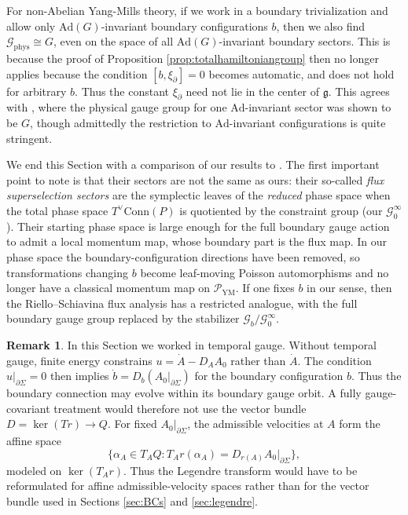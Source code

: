 \documentclass{article}
\theoremstyle{definition}
\newtheorem{remark}[definition]{Remark}
\begin{document}
For non-Abelian Yang-Mills theory, if we work in a boundary trivialization and allow only $\text{Ad}(G)$-invariant boundary configurations $b$, then we also find $\mathcal{G}_\text{phys}\cong G$, even on the space of all $\text{Ad}(G)$-invariant boundary sectors. This is because the proof of Proposition \ref{prop:totalhamiltoniangroup} then no longer applies because the condition $[b,\xi_\partial]=0$ becomes automatic, and does not hold for arbitrary $b$. Thus the constant $\xi_\partial$ need not lie in the center of $\mathfrak g$. This agrees with \cite{Borsboom:2025agn}, where the physical gauge group for one $\text{Ad}$-invariant sector was shown to be $G$, though admittedly the restriction to $\text{Ad}$-invariant configurations is quite stringent. 

We end this Section with a comparison of our results to \cite{rielloHamiltonianGaugeTheory2024}. The first important point to note is that their sectors are not the same as ours: their so-called \textit{flux superselection sectors} are the symplectic leaves of the \textit{reduced} phase space when the total phase space $T^\vee\text{Conn}(P)$ is quotiented by the constraint group (our $\mathcal{G}^\infty_0$). Their starting phase space is large enough for the full boundary gauge action to admit a local momentum map, whose boundary part is the flux map. In our phase space the boundary-configuration directions have been removed, so transformations changing \(b\) become leaf-moving Poisson
automorphisms and no longer have a classical momentum map on \(\mathcal{P}_{\mathrm{YM}}\). If one fixes \(b\) in our sense, then the Riello--Schiavina flux analysis has a restricted analogue, with the full boundary gauge group replaced by
the stabilizer \(\mathcal G_b/\mathcal G^\infty_0\).

\begin{remark}
In this Section we worked in temporal gauge. Without temporal gauge, finite energy constrains $u=\dot A-D_AA_0$
rather than \(\dot A\). The condition \(u|_{\partial\Sigma}=0\)
then implies $\dot b=D_b(A_0|_{\partial\Sigma})$
for the boundary configuration $b$. Thus the boundary connection may evolve within its boundary gauge
orbit. A fully gauge-covariant treatment would therefore not use the vector bundle
\(D=\ker(Tr)\to Q\). For fixed \(A_0|_{\partial\Sigma}\), the admissible
velocities at \(A\) form the affine space
\[
\{\alpha_A\in T_AQ:T_A r(\alpha_A)=D_{r(A)} A_0|_{\partial\Sigma}\},
\]
modeled on \(\ker(T_A r)\). Thus the Legendre transform would have to be
reformulated for affine admissible-velocity spaces rather than for the vector
bundle used in Sections \ref{sec:BCs} and \ref{sec:legendre}.
\end{remark}
\end{document}
